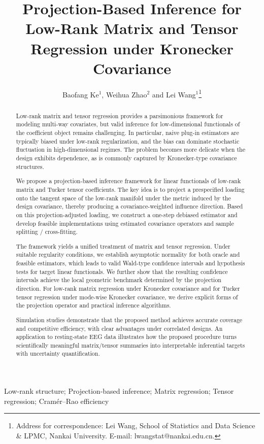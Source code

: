 \documentclass[authoryear,preprint,review,12pt]{elsarticle}
\begin{document}
	
	
	
	\begin{frontmatter}
		\author{Baofang Ke$^1$,    Weihua Zhao$^2$ and Lei Wang$^1$\footnote{Address for correspondence: Lei Wang, School of Statistics and Data Science \& LPMC, Nankai University. E-mail: lwangstat@nankai.edu.cn.} }
		\title{Projection-Based Inference for Low-Rank Matrix and Tensor Regression under Kronecker Covariance}
		\address{$^1$ School of Statistics and Data Science \& LPMC,
			Nankai University, Tianjin, 300071, P.R. China
			\\
			$^2$ School of Science, Nantong University, Nantong, 226019, P.R. China}
		\begin{abstract} 
			Low-rank matrix and tensor regression provides a parsimonious framework for modeling multi-way covariates, but valid inference for low-dimensional functionals of the coefficient object remains challenging. In particular, naive plug-in estimators are typically biased under low-rank regularization, and the bias can dominate stochastic fluctuation in high-dimensional regimes. The problem becomes more delicate when the design exhibits dependence, as is commonly captured by Kronecker-type covariance structures.
			
			We propose a projection-based inference framework for linear functionals of low-rank matrix and Tucker tensor coefficients. The key idea is to project a prespecified loading onto the tangent space of the low-rank manifold under the metric induced by the design covariance, thereby producing a covariance-weighted influence direction. Based on this projection-adjusted loading, we construct a one-step debiased estimator and develop feasible implementations using estimated covariance operators and sample splitting / cross-fitting.
			
			The framework yields a unified treatment of matrix and tensor regression. Under suitable regularity conditions, we establish asymptotic normality for both oracle and feasible estimators, which leads to valid Wald-type confidence intervals and hypothesis tests for target linear functionals. We further show that the resulting confidence intervals achieve the local geometric benchmark determined by the projection direction. For low-rank matrix regression under Kronecker covariance and for Tucker tensor regression under mode-wise Kronecker covariance, we derive explicit forms of the projection operator and practical inference algorithms.
			
			Simulation studies demonstrate that the proposed method achieves accurate coverage and competitive efficiency, with clear advantages under correlated designs. An application to resting-state EEG data illustrates how the proposed procedure turns scientifically meaningful matrix/tensor summaries into interpretable inferential targets with uncertainty quantification.
		\end{abstract}
		\begin{keyword}
			Low-rank structure; Projection-based inference; Matrix regression; Tensor regression; Cram\'er–Rao efficiency
		\end{keyword}
	\end{frontmatter}
	
\end{document}
